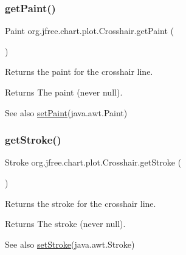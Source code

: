 \subsubsection{\texorpdfstring{get\+Paint()}{getPaint()}}
{\footnotesize\ttfamily Paint org.\+jfree.\+chart.\+plot.\+Crosshair.\+get\+Paint (\begin{DoxyParamCaption}{ }\end{DoxyParamCaption})}

Returns the paint for the crosshair line.

\begin{DoxyReturn}{Returns}
The paint (never {\ttfamily null}).
\end{DoxyReturn}
\begin{DoxySeeAlso}{See also}
\mbox{\hyperlink{classorg_1_1jfree_1_1chart_1_1plot_1_1_crosshair_a941b74a54828b6864ffd2557fcdc9ecd}{set\+Paint}}(java.\+awt.\+Paint) 
\end{DoxySeeAlso}
\mbox{\label{classorg_1_1jfree_1_1chart_1_1plot_1_1_crosshair_a41dcb9cd8c65d0630b74cd1488d0c4fd}} 
\subsubsection{\texorpdfstring{get\+Stroke()}{getStroke()}}
{\footnotesize\ttfamily Stroke org.\+jfree.\+chart.\+plot.\+Crosshair.\+get\+Stroke (\begin{DoxyParamCaption}{ }\end{DoxyParamCaption})}

Returns the stroke for the crosshair line.

\begin{DoxyReturn}{Returns}
The stroke (never {\ttfamily null}).
\end{DoxyReturn}
\begin{DoxySeeAlso}{See also}
\mbox{\hyperlink{classorg_1_1jfree_1_1chart_1_1plot_1_1_crosshair_afa44c3954b377eea8f5df66affefc242}{set\+Stroke}}(java.\+awt.\+Stroke) 
\end{DoxySeeAlso}
\mbox{\label{classorg_1_1jfree_1_1chart_1_1plot_1_1_crosshair_aa27be6dd0ed5c8fdf98c00a2e34c98e0}} 
